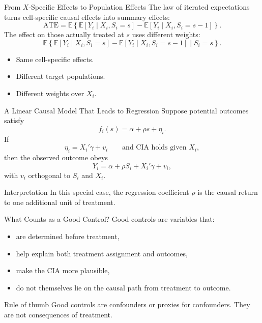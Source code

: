 \documentclass[11pt,aspectratio=169]{beamer}
\newcommand{\E}{\mathbb{E}}
\newcommand{\ATE}{\mathrm{ATE}}
\newcommand{\derivbutton}[1]{\vspace{0.4em}\hfill\hyperlink{app:#1}{\beamerbutton{Appendix details}}}
\begin{document}
\begin{frame}{From \(X\)-Specific Effects to Population Effects}
  The law of iterated expectations turns cell-specific causal effects into summary effects:
  \[
    \ATE
    =
    \E\left\{\E[Y_i \mid X_i,S_i=s]-\E[Y_i \mid X_i,S_i=s-1]\right\}.
  \]
  The effect on those actually treated at \(s\) uses different weights:
  \[
    \E\left\{\E[Y_i \mid X_i,S_i=s]-\E[Y_i \mid X_i,S_i=s-1]\mid S_i=s\right\}.
  \]
  \begin{itemize}
    \item Same cell-specific effects.
    \item Different target populations.
    \item Different weights over \(X_i\).
  \end{itemize}
\end{frame}

\begin{frame}{A Linear Causal Model That Leads to Regression}
  Suppose potential outcomes satisfy
  \[
    f_i(s)=\alpha+\rho s+\eta_i.
  \]
  If
  \[
    \eta_i = X_i'\gamma + v_i
    \qquad \text{and CIA holds given } X_i,
  \]
  then the observed outcome obeys
  \[
    Y_i=\alpha+\rho S_i+X_i'\gamma+v_i,
  \]
  with \(v_i\) orthogonal to \(S_i\) and \(X_i\).
  \begin{block}{Interpretation}
    In this special case, the regression coefficient \(\rho\) is the causal return to one additional unit of treatment.
  \end{block}
  \derivbutton{cia-proof}
\end{frame}

\begin{frame}{What Counts as a Good Control?}
  Good controls are variables that:
  \begin{itemize}
    \item are determined before treatment,
    \item help explain both treatment assignment and outcomes,
    \item make the CIA more plausible,
    \item do not themselves lie on the causal path from treatment to outcome.
  \end{itemize}
  \begin{block}{Rule of thumb}
    Good controls are confounders or proxies for confounders. They are not consequences of treatment.
  \end{block}
\end{frame}
\end{document}
